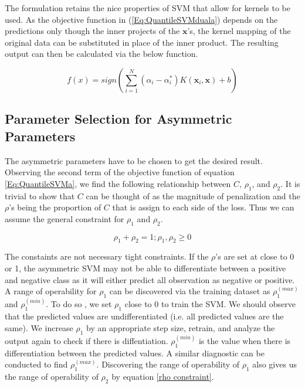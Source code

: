 The formulation retains the nice properties of SVM that allow for kernels to be used. As the objective function in (\ref{Eq:QuantileSVMduala}) depends on the predictions only though the inner projects of the $\mathbf{x}$'s, the kernel mapping of the original data can be substituted in place of the inner product. The resulting output can then be calculated via the below function. 

\begin{equation}\label{finalpredictioneqn2}
f(x)=sign(\displaystyle\sum_{i=1}^N (\alpha_i - \alpha_i^*)K(\mathbf{x}_i,\mathbf{x})+b)
\end{equation}

\subsection{Parameter Selection for Asymmetric Parameters}
The asymmetric parameters have to be chosen to get the desired result. Observing the second term of the objective function of equation \ref{Eq:QuantileSVMa}, we find the following relationship between $C$, $\rho_1$, and $\rho_2$. It is trivial to show that $C$ can be thought of as the magnitude of penalization and the $\rho$'s being the proportion of $C$ that is assign to each side of the loss. Thus we can assume the general constraint for $\rho_1$ and $\rho_2$.

\begin{equation}\label{rho constraint}
\rho_1 + \rho_2 =1; \rho_1,\rho_2 \geq 0
\end{equation}

The constaints are not necessary tight constraints. If the $\rho$'s are set at close to 0 or 1, the asymmetric SVM may not be able to differentiate between a positive and negative class as it will either predict all observation as negative or positive. A range of operability for $\rho_1$ can be discovered via the training dataset as $\rho_1^{(max)}$ and $\rho_1^{(min)}$. To do so , we set $\rho_1$ close to 0 to train the SVM. We should observe that the predicted values are undifferentiated (i.e. all predicted values are the same). We increase $\rho_1$ by an appropriate step size, retrain, and analyze the output again to check if there is diffentiation. $\rho_1^{(min)}$ is the value when there is differentiation between the predicted values. A similar diagnostic can be conducted to find $\rho_1^{(max)}$. Discovering the range of operability of $\rho_1$ also gives us the range of operability of $\rho_2$ by equation \ref{rho constraint}.

